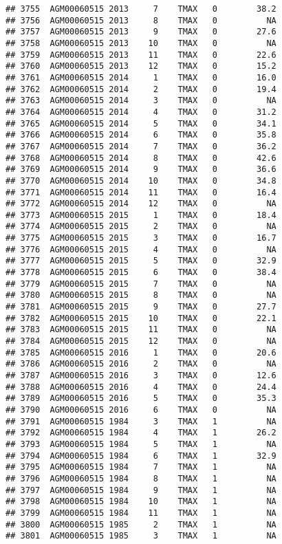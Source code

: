 \documentclass{article}\usepackage[]{graphicx}\usepackage[]{color}
\makeatletter
\newenvironment{kframe}{%
 \def\at@end@of@kframe{}%
 \ifinner\ifhmode%
  \def\at@end@of@kframe{\end{minipage}}%
  \begin{minipage}{\columnwidth}%
 \fi\fi%
 \def\FrameCommand##1{\hskip\@totalleftmargin \hskip-\fboxsep
 \colorbox{shadecolor}{##1}\hskip-\fboxsep
     \hskip-\linewidth \hskip-\@totalleftmargin \hskip\columnwidth}%
 \MakeFramed {\advance\hsize-\width
   \@totalleftmargin\z@ \linewidth\hsize
   \@setminipage}}%
 {\par\unskip\endMakeFramed%
 \at@end@of@kframe}
\newenvironment{knitrout}{}{} %
\makeatother
\begin{document}
\begin{knitrout}
\begin{kframe}
\begin{verbatim}
## 3755  AGM00060515 2013     7    TMAX   0        38.2
## 3756  AGM00060515 2013     8    TMAX   0          NA
## 3757  AGM00060515 2013     9    TMAX   0        27.6
## 3758  AGM00060515 2013    10    TMAX   0          NA
## 3759  AGM00060515 2013    11    TMAX   0        22.6
## 3760  AGM00060515 2013    12    TMAX   0        15.2
## 3761  AGM00060515 2014     1    TMAX   0        16.0
## 3762  AGM00060515 2014     2    TMAX   0        19.4
## 3763  AGM00060515 2014     3    TMAX   0          NA
## 3764  AGM00060515 2014     4    TMAX   0        31.2
## 3765  AGM00060515 2014     5    TMAX   0        34.1
## 3766  AGM00060515 2014     6    TMAX   0        35.8
## 3767  AGM00060515 2014     7    TMAX   0        36.2
## 3768  AGM00060515 2014     8    TMAX   0        42.6
## 3769  AGM00060515 2014     9    TMAX   0        36.6
## 3770  AGM00060515 2014    10    TMAX   0        34.8
## 3771  AGM00060515 2014    11    TMAX   0        16.4
## 3772  AGM00060515 2014    12    TMAX   0          NA
## 3773  AGM00060515 2015     1    TMAX   0        18.4
## 3774  AGM00060515 2015     2    TMAX   0          NA
## 3775  AGM00060515 2015     3    TMAX   0        16.7
## 3776  AGM00060515 2015     4    TMAX   0          NA
## 3777  AGM00060515 2015     5    TMAX   0        32.9
## 3778  AGM00060515 2015     6    TMAX   0        38.4
## 3779  AGM00060515 2015     7    TMAX   0          NA
## 3780  AGM00060515 2015     8    TMAX   0          NA
## 3781  AGM00060515 2015     9    TMAX   0        27.7
## 3782  AGM00060515 2015    10    TMAX   0        22.1
## 3783  AGM00060515 2015    11    TMAX   0          NA
## 3784  AGM00060515 2015    12    TMAX   0          NA
## 3785  AGM00060515 2016     1    TMAX   0        20.6
## 3786  AGM00060515 2016     2    TMAX   0          NA
## 3787  AGM00060515 2016     3    TMAX   0        12.6
## 3788  AGM00060515 2016     4    TMAX   0        24.4
## 3789  AGM00060515 2016     5    TMAX   0        35.3
## 3790  AGM00060515 2016     6    TMAX   0          NA
## 3791  AGM00060515 1984     3    TMAX   1          NA
## 3792  AGM00060515 1984     4    TMAX   1        26.2
## 3793  AGM00060515 1984     5    TMAX   1          NA
## 3794  AGM00060515 1984     6    TMAX   1        32.9
## 3795  AGM00060515 1984     7    TMAX   1          NA
## 3796  AGM00060515 1984     8    TMAX   1          NA
## 3797  AGM00060515 1984     9    TMAX   1          NA
## 3798  AGM00060515 1984    10    TMAX   1          NA
## 3799  AGM00060515 1984    11    TMAX   1          NA
## 3800  AGM00060515 1985     2    TMAX   1          NA
## 3801  AGM00060515 1985     3    TMAX   1          NA

\end{verbatim}
\end{kframe}
\end{knitrout}
\end{document}

